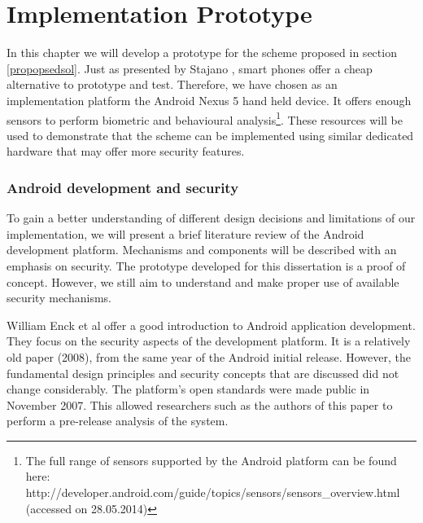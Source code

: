 
\chapter{Implementation Prototype} %

\label{Chapter4} %

In this chapter we will develop a prototype for the scheme proposed in section \ref{propopsedsol}. Just as presented by Stajano \cite{stajano2011pico}, smart phones offer a cheap alternative to prototype and test. Therefore, we have chosen as an implementation platform the Android Nexus 5 hand held device. It offers enough sensors to perform biometric and behavioural analysis\footnote{The full range of sensors supported by the Android platform can be found here: http://developer.android.com/guide/topics/sensors/sensors\_overview.html (accessed on 28.05.2014)}. These resources will be used to demonstrate that the scheme can be implemented using similar dedicated hardware that may offer more security features.

\subsection{Android development and security}
\label{androidsecurity}
To gain a better understanding of different design decisions and limitations of our implementation, we will present a brief literature review of the Android development platform. Mechanisms and components will be described with an emphasis on security. The prototype developed for this dissertation is a proof of concept. However, we still aim to understand and make proper use of available security mechanisms. 

William Enck et al \cite{enck2009understanding} offer a good introduction to Android application development. They focus on the security aspects of the development platform. It is a relatively old paper (2008), from the same year of the Android initial release. However, the fundamental design principles and security concepts that are discussed did not change considerably. The platform's open standards were made public in November 2007. This allowed researchers such as the authors of this paper to perform a pre-release analysis of the system.

